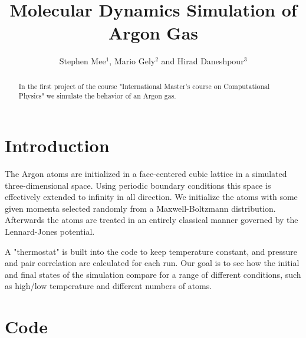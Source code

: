 \documentclass[10pt,letterpaper]{article}
\begin{document}
\title{Molecular Dynamics Simulation of Argon Gas}

\author{Stephen Mee$^1$, Mario Gely$^2$ and Hirad Daneshpour$^3$}

\address{$^1$Michigan State University (U.S.A.)\\
$^{2,3}$Delft University of Technology (etherlands)}

\begin{abstract}
In the first project of the course "International Master's course on Computational Physics" we simulate the behavior of an Argon gas.
\end{abstract}


\section{Introduction}




The Argon atoms are initialized in a face-centered cubic lattice in a simulated three-dimensional space. Using periodic boundary conditions this space is effectively extended to infinity in all direction. We initialize the atoms with some given momenta selected randomly from a Maxwell-Boltzmann distribution. Afterwards the atoms are treated in an entirely classical manner governed by the Lennard-Jones potential.

A "thermostat" is built into the code to keep temperature constant, and pressure and pair correlation are calculated for each run. Our goal is to see how the initial and final states of the simulation compare for a range of different conditions, such as high/low temperature and different numbers of atoms.


\section{Code}
\end{document}
